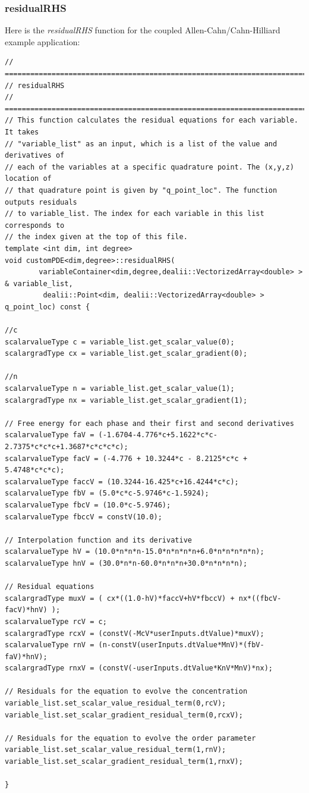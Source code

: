 \documentclass[10pt]{article} %
\begin{document}
\subsubsection{residualRHS}
Here is the \emph{residualRHS} function for the coupled Allen-Cahn/Cahn-Hilliard example application:
\scriptsize
\begin{lstlisting}
// =================================================================================
// residualRHS
// =================================================================================
// This function calculates the residual equations for each variable. It takes
// "variable_list" as an input, which is a list of the value and derivatives of
// each of the variables at a specific quadrature point. The (x,y,z) location of
// that quadrature point is given by "q_point_loc". The function outputs residuals
// to variable_list. The index for each variable in this list corresponds to
// the index given at the top of this file.
template <int dim, int degree>
void customPDE<dim,degree>::residualRHS(
		variableContainer<dim,degree,dealii::VectorizedArray<double> > & variable_list,
		 dealii::Point<dim, dealii::VectorizedArray<double> > q_point_loc) const {

//c
scalarvalueType c = variable_list.get_scalar_value(0);
scalargradType cx = variable_list.get_scalar_gradient(0);

//n
scalarvalueType n = variable_list.get_scalar_value(1);
scalargradType nx = variable_list.get_scalar_gradient(1);

// Free energy for each phase and their first and second derivatives
scalarvalueType faV = (-1.6704-4.776*c+5.1622*c*c-2.7375*c*c*c+1.3687*c*c*c*c);
scalarvalueType facV = (-4.776 + 10.3244*c - 8.2125*c*c + 5.4748*c*c*c);
scalarvalueType faccV = (10.3244-16.425*c+16.4244*c*c);
scalarvalueType fbV = (5.0*c*c-5.9746*c-1.5924);
scalarvalueType fbcV = (10.0*c-5.9746);
scalarvalueType fbccV = constV(10.0);

// Interpolation function and its derivative
scalarvalueType hV = (10.0*n*n*n-15.0*n*n*n*n+6.0*n*n*n*n*n);
scalarvalueType hnV = (30.0*n*n-60.0*n*n*n+30.0*n*n*n*n);

// Residual equations
scalargradType muxV = ( cx*((1.0-hV)*faccV+hV*fbccV) + nx*((fbcV-facV)*hnV) );
scalarvalueType rcV = c;
scalargradType rcxV = (constV(-McV*userInputs.dtValue)*muxV);
scalarvalueType rnV = (n-constV(userInputs.dtValue*MnV)*(fbV-faV)*hnV);
scalargradType rnxV = (constV(-userInputs.dtValue*KnV*MnV)*nx);

// Residuals for the equation to evolve the concentration 
variable_list.set_scalar_value_residual_term(0,rcV);
variable_list.set_scalar_gradient_residual_term(0,rcxV);

// Residuals for the equation to evolve the order parameter
variable_list.set_scalar_value_residual_term(1,rnV);
variable_list.set_scalar_gradient_residual_term(1,rnxV);

}
\end{lstlisting}
\normalsize
\end{document}
